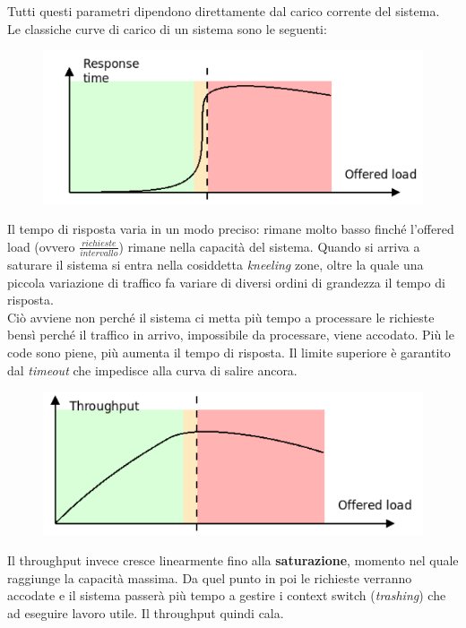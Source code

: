 \documentclass{article}
\begin{document}
		Tutti questi parametri dipendono direttamente dal carico corrente del sistema.\\
		
		Le classiche curve di carico di un sistema sono le seguenti:
		\begin{figure}[ht]
			\centering
			\includegraphics[width=0.7\linewidth]{SAC_D1_load1}
			\label{fig:sacd1load1}
		\end{figure}
		
		Il tempo di risposta varia in un modo preciso: rimane molto basso finché l’offered load (ovvero $\frac{richieste}{intervallo}$) rimane nella capacità del sistema. Quando si arriva a saturare il sistema si entra nella cosiddetta \textit{kneeling} zone, oltre la quale una piccola variazione di traffico fa variare di diversi ordini di grandezza il tempo di risposta.\\
		Ciò avviene non perché il sistema ci metta più tempo a processare le richieste bensì perché il traffico in arrivo, impossibile da processare, viene accodato.
		Più le code sono piene, più aumenta il tempo di risposta. Il limite superiore è garantito dal \textit{timeout} che impedisce alla curva di salire ancora. 
		
		\begin{figure}[ht]
			\centering
			\includegraphics[width=0.7\linewidth]{SAC_D1_load2}
			\label{fig:sacd1load2}
		\end{figure}
		
		Il throughput invece cresce linearmente fino alla \textbf{saturazione}, momento nel quale raggiunge la capacità massima. Da quel punto in poi le richieste verranno accodate e il sistema passerà più tempo a gestire i context switch (\textit{trashing}) che ad eseguire lavoro utile. Il throughput quindi cala.
		
\end{document}
